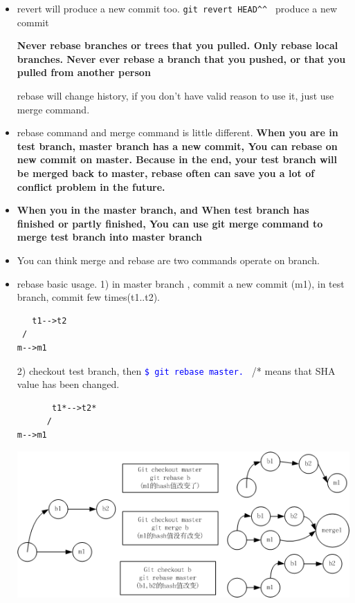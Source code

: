 \documentclass[a4paper,12pt,twoside]{book}
\newcommand{\linuxcommand}[1]{\texttt{\textcolor{blue}{\$ #1 \Pisymbol{psy}{191}}}}
\begin{document}
\begin{itemize}
\begin{itemize}
\item revert will produce a new commit too. \verb=git revert HEAD^^ = produce a new commit

\textbf{Never rebase branches or trees that you pulled. Only rebase local branches.
Never ever rebase a branch that you pushed, or that you pulled from another person}
\par rebase will change history, if you don't have valid reason to use it, just use merge
command.

\item rebase command and merge command is little different. \textbf{When you are in test branch, master branch has a new commit, You can rebase on new commit on master. Because in the end, your test branch will be merged back to master, rebase often can save you a lot of conflict problem in the future. }

\item \textbf{When you in the master branch, and When test branch has finished or partly finished, You can use git merge command to merge test branch into master branch}

\item You can think merge and rebase are two commands operate on branch.

\item rebase basic usage.
1) in master  branch , commit a new commit (m1), in test branch, commit few times(t1..t2). \\
\begin{verbatim}
   t1-->t2
 /
m-->m1
\end{verbatim}
2) checkout test branch, then \linuxcommand{git rebase master.} /* means that SHA value has been changed.\\
\begin{verbatim}
       t1*-->t2*
      /
m-->m1
\end{verbatim}

\includegraphics[scale=0.7]{pics/Git_rebase} \\


\end{itemize}
\end{itemize}
\end{document}
